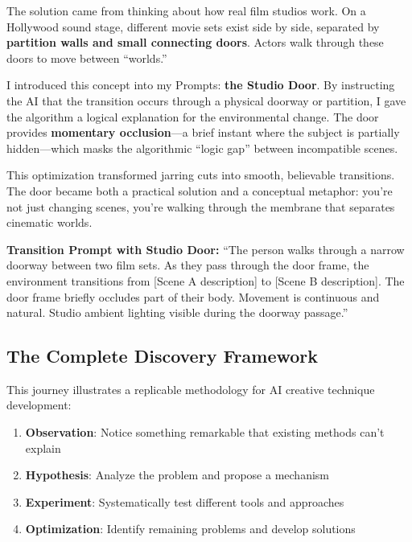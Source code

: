 The solution came from thinking about how real film studios work. On a Hollywood sound stage, different movie sets exist side by side, separated by \textbf{partition walls and small connecting doors}. Actors walk through these doors to move between ``worlds.''

I introduced this concept into my Prompts: \textbf{the Studio Door}. By instructing the AI that the transition occurs through a physical doorway or partition, I gave the algorithm a logical explanation for the environmental change. The door provides \textbf{momentary occlusion}—a brief instant where the subject is partially hidden—which masks the algorithmic ``logic gap'' between incompatible scenes.

This optimization transformed jarring cuts into smooth, believable transitions. The door became both a practical solution and a conceptual metaphor: you're not just changing scenes, you're walking through the membrane that separates cinematic worlds.

\begin{Prompt}
\textbf{Transition Prompt with Studio Door:}
``The person walks through a narrow doorway between two film sets. As they pass through the door frame, the environment transitions from [Scene A description] to [Scene B description]. The door frame briefly occludes part of their body. Movement is continuous and natural. Studio ambient lighting visible during the doorway passage.''
\end{Prompt}

\subsection{The Complete Discovery Framework}

This journey illustrates a replicable methodology for AI creative technique development:

\begin{enumerate}
\item \textbf{Observation}: Notice something remarkable that existing methods can't explain
\item \textbf{Hypothesis}: Analyze the problem and propose a mechanism
\item \textbf{Experiment}: Systematically test different tools and approaches
\item \textbf{Optimization}: Identify remaining problems and develop solutions
\end{enumerate}

